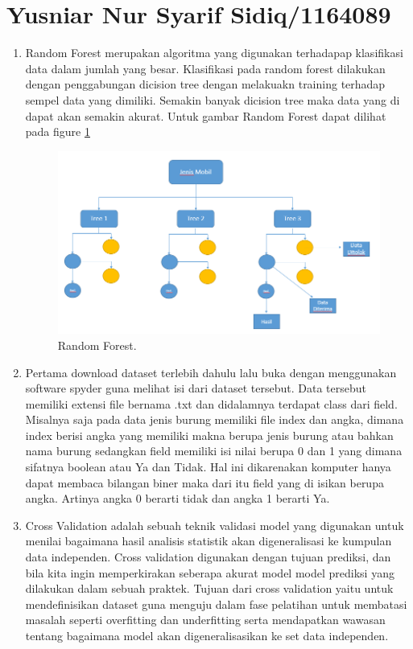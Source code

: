 \section{Yusniar Nur Syarif Sidiq/1164089}
\begin{enumerate}

\item Random Forest merupakan algoritma yang digunakan terhadapap klasifikasi data dalam jumlah yang besar. Klasifikasi pada random forest dilakukan dengan penggabungan dicision tree dengan melakuakn training terhadap sempel data yang dimiliki. Semakin banyak dicision tree maka data yang di dapat akan semakin akurat. Untuk gambar Random Forest dapat dilihat pada figure \ref{YNRF}

	\begin{figure}[ht]
	\centerline{\includegraphics[width=1\textwidth]{figures/YN/RF.PNG}}
	\caption{Random Forest.}
	\label{YNRF}
	\end{figure}

\item Pertama download dataset terlebih dahulu lalu buka dengan menggunakan software spyder guna melihat isi dari dataset tersebut. Data tersebut memiliki extensi file bernama .txt dan didalamnya terdapat class dari field. Misalnya saja pada data jenis burung memiliki file index dan angka, dimana index berisi angka yang memiliki makna berupa jenis burung atau bahkan nama burung sedangkan field memiliki isi nilai berupa 0 dan 1 yang dimana sifatnya boolean atau Ya dan Tidak. Hal ini dikarenakan komputer hanya dapat membaca bilangan biner maka dari itu field yang di isikan berupa angka. Artinya angka 0 berarti tidak dan angka 1 berarti Ya.

\item Cross Validation adalah sebuah teknik validasi model yang digunakan untuk menilai bagaimana hasil analisis statistik akan digeneralisasi ke kumpulan data independen. Cross validation digunakan dengan tujuan prediksi, dan bila kita ingin memperkirakan seberapa akurat model model prediksi yang dilakukan dalam sebuah praktek. Tujuan dari cross validation yaitu untuk mendefinisikan dataset guna menguju dalam fase pelatihan untuk membatasi masalah seperti overfitting dan underfitting serta mendapatkan wawasan tentang bagaimana model akan digeneralisasikan ke set data independen.


\end{enumerate}
